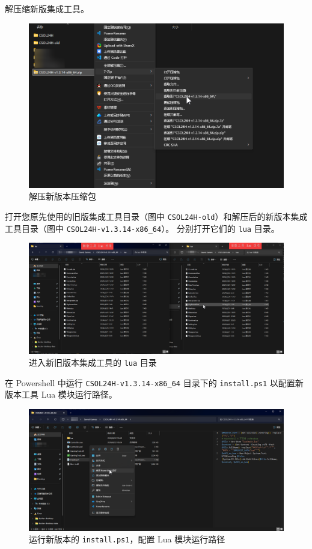 解压缩新版集成工具。

\begin{figure}[H]
    \Centering
    \includegraphics[width=\textwidth]{docs/assets/update/extract_new_version.png}
    \caption{解压新版本压缩包}
\end{figure}

打开您原先使用的旧版集成工具目录（图中 \lstinline{CSOL24H-old}）和解压后的新版本集成工具目录（图中 \lstinline{CSOL24H-v1.3.14-x86_64}）。
分别打开它们的 \lstinline{lua} 目录。

\begin{figure}[H]
    \Centering
    \includegraphics[width=\textwidth]{docs/assets/update/replace_00.png}
    \caption{进入新旧版本集成工具的 \lstinline{lua} 目录}
\end{figure}

在 Powershell 中运行 \lstinline{CSOL24H-v1.3.14-x86_64} 目录下的 \lstinline{install.ps1} 以配置新版本工具 Lua 模块运行路径。

\begin{figure}[H]
    \Centering
    \includegraphics[width=\textwidth]{docs/assets/update/run_install.png}
    \caption{运行新版本的 \lstinline{install.ps1}，配置 Lua 模块运行路径}
\end{figure}

